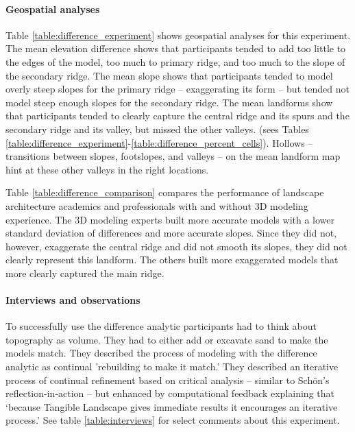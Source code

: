 \documentclass[prodmode,acmtochi]{acmsmall} %
\begin{document}
\paragraph{Geospatial analyses}
Table \ref{table:difference_experiment} 
shows geospatial analyses for this experiment.
%
The mean elevation difference shows that participants tended to add
too little to the edges of the model,
too much to primary ridge,
and too much to the slope of the secondary ridge. 
The mean slope shows that participants tended to model 
overly steep slopes for the primary ridge -- exaggerating its form --
but tended not model steep enough slopes for the secondary ridge. 
The mean landforms show that participants tended to 
clearly capture the central ridge and its spurs and
the secondary ridge and its valley, but missed the 
other valleys.
(sees Tables \ref{table:difference_experiment}-\ref{table:difference_percent_cells}). 
Hollows -- transitions between slopes, footslopes, and valleys -- 
on the mean landform map hint at these other 
valleys in the right locations.

Table \ref{table:difference_comparison} compares the performance of 
landscape architecture academics and professionals 
with and without 3D modeling experience. 
The 3D modeling experts built more accurate models
with a lower standard deviation of differences 
and more accurate slopes. 
Since they did not, however, exaggerate the central ridge
and did not smooth its slopes, 
they did not clearly represent this landform. 
The others built more exaggerated models 
that more clearly captured the main ridge.

\paragraph{Interviews and observations}
To successfully use the difference analytic 
participants had to think about topography as volume.
They had to either add or excavate sand to make the models match. 
They described the process of modeling with the difference analytic
as continual 'rebuilding to make it match.'
They described an iterative process of 
continual refinement based on critical analysis 
-- similar to Sch{\"o}n's reflection-in-action \cite{Schon1983} --
but enhanced by computational feedback 
explaining that 
`because Tangible Landscape gives immediate results 
it encourages an iterative process.' 
See table \ref{table:interviews} for select comments about this experiment.
\end{document}
